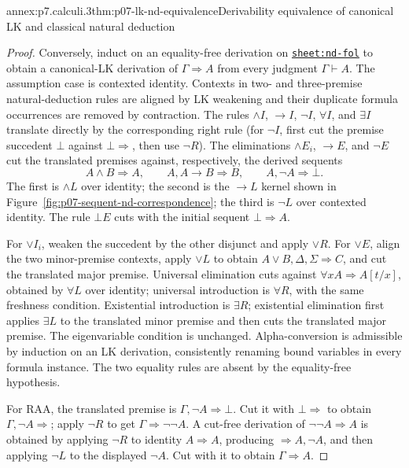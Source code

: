 \begin{annexitem}{annex:p7.calculi.3}{thm:p07-lk-nd-equivalence}{Derivability equivalence of canonical LK and classical natural deduction}
\begin{proof}
Conversely, induct on an equality-free derivation on
\hyperref[sheet:nd-fol]{\texttt{sheet:nd-fol}} to obtain a canonical-LK
derivation of \(\Gamma\Rightarrow A\) from every judgment
\(\Gamma\vdash A\).  The assumption case is contexted identity.  Contexts in
two- and three-premise natural-deduction rules are aligned by LK weakening and
their duplicate formula occurrences are removed by contraction.
The rules \(\land I\), \(\to I\), \(\neg I\), \(\forall I\), and
\(\exists I\) translate directly by the corresponding right rule (for
\(\neg I\), first cut the premise succedent \(\bot\) against
\(\bot\Rightarrow\), then use \(\neg R\)).  The eliminations
\(\land E_i\), \(\to E\), and \(\neg E\) cut the translated premises against,
respectively, the derived sequents
\[
 A\land B\Rightarrow A,\qquad
 A,A\to B\Rightarrow B,
 \qquad
 A,\neg A\Rightarrow\bot.
\]
The first is \(\land L\) over identity; the second is the \(\to L\) kernel
shown in Figure~\ref{fig:p07-sequent-nd-correspondence}; the third is
\(\neg L\) over contexted identity.  The rule \(\bot E\) cuts with the
initial sequent \(\bot\Rightarrow A\).

For \(\lor I_i\), weaken the succedent by the other disjunct and apply
\(\lor R\).  For \(\lor E\), align the two minor-premise contexts, apply
\(\lor L\) to obtain \(A\lor B,\Delta,\Sigma\Rightarrow C\), and cut the
translated major premise.  Universal elimination cuts against
\(\forall xA\Rightarrow A[t/x]\), obtained by \(\forall L\) over identity;
universal introduction is \(\forall R\), with the same freshness condition.
Existential introduction is \(\exists R\); existential elimination first
applies \(\exists L\) to the translated minor premise and then cuts the
translated major premise.  The eigenvariable condition is unchanged.
Alpha-conversion is admissible by induction on an LK derivation, consistently
renaming bound variables in every formula instance.  The two equality rules
are absent by the equality-free hypothesis.

For RAA, the translated premise is
\(\Gamma,\neg A\Rightarrow\bot\).  Cut it with \(\bot\Rightarrow\) to obtain
\(\Gamma,\neg A\Rightarrow\); apply \(\neg R\) to get
\(\Gamma\Rightarrow\neg\neg A\).  A cut-free derivation of
\(\neg\neg A\Rightarrow A\) is obtained by applying \(\neg R\) to identity
\(A\Rightarrow A\), producing \(\Rightarrow A,\neg A\), and then applying
\(\neg L\) to the displayed \(\neg A\).  Cut with it to obtain
\(\Gamma\Rightarrow A\).


\end{proof}
\end{annexitem}
